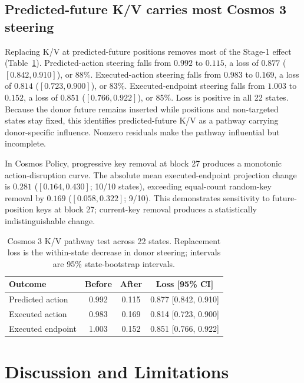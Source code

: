 \subsection{Predicted-future K/V carries most Cosmos 3 steering}

Replacing K/V at predicted-future positions removes most of the Stage-1 effect (Table~\ref{tab:kv_short}). Predicted-action steering falls from $0.992$ to $0.115$, a loss of $0.877$ ($[0.842,0.910]$), or 88\%. Executed-action steering falls from $0.983$ to $0.169$, a loss of $0.814$ ($[0.723,0.900]$), or 83\%. Executed-endpoint steering falls from $1.003$ to $0.152$, a loss of $0.851$ ($[0.766,0.922]$), or 85\%. Loss is positive in all 22 states. Because the donor future remains inserted while positions and non-targeted states stay fixed, this identifies predicted-future K/V as a pathway carrying donor-specific influence. Nonzero residuals make the pathway influential but incomplete.

In Cosmos Policy, progressive key removal at block 27 produces a monotonic action-disruption curve. The absolute mean executed-endpoint projection change is $0.281$ ($[0.164,0.430]$; 10/10 states), exceeding equal-count random-key removal by $0.169$ ($[0.058,0.322]$; 9/10). This demonstrates sensitivity to future-position keys at block 27; current-key removal produces a statistically indistinguishable change.

\begin{table}[t]
  \centering
  \caption{Cosmos 3 K/V pathway test across 22 states. Replacement loss is the within-state decrease in donor steering; intervals are 95\% state-bootstrap intervals.}
  \label{tab:kv_short}
  \scriptsize
  \setlength{\tabcolsep}{5pt}
  \begin{tabular}{@{}lccc@{}}
    \toprule
    Outcome & Before & After & Loss [95\% CI] \\
    \midrule
    Predicted action & 0.992 & 0.115 & 0.877 [0.842, 0.910] \\
    Executed action & 0.983 & 0.169 & 0.814 [0.723, 0.900] \\
    Executed endpoint & 1.003 & 0.152 & 0.851 [0.766, 0.922] \\
    \bottomrule
  \end{tabular}
\end{table}

\section{Discussion and Limitations}

